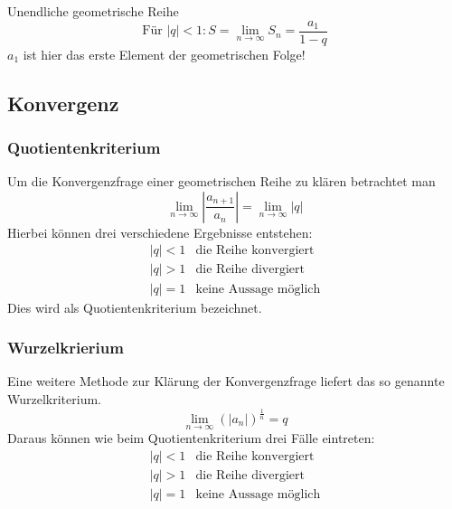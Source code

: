 Unendliche geometrische Reihe
\[ \boxed{\text{Für } |q| < 1: S = \lim_{n \rightarrow \infty} S_n 
= \frac{a_1}{1 - q}} \] 
$a_1$ ist hier das erste Element der geometrischen Folge!

\subsection{Konvergenz}

\subsubsection*{Quotientenkriterium}
Um die Konvergenzfrage einer geometrischen Reihe zu klären betrachtet man
\[\boxed{ \lim\limits_{n \rightarrow \infty} \left| \frac{a_{n+1}}{a_n} \right| 
= \lim\limits_{n \rightarrow \infty} \left| q \right|} \]
Hierbei können drei verschiedene Ergebnisse entstehen:
\[ \boxed{\begin{array}{ll}
|q| < 1 & \text{die Reihe konvergiert} \\
|q| > 1 & \text{die Reihe divergiert} \\
|q| = 1 & \text{keine Aussage möglich}
\end{array}} \]
Dies wird als Quotientenkriterium bezeichnet.

\subsubsection*{Wurzelkrierium}
Eine weitere Methode zur Klärung der Konvergenzfrage liefert das so genannte 
Wurzelkriterium.
\[\boxed{ \lim\limits_{n \rightarrow \infty} \left( |a_n| \right)^{\frac{1}{n}} 
= q }\]
Daraus können wie beim Quotientenkriterium drei Fälle eintreten:
\[ \boxed{\begin{array}{ll}
|q| < 1 & \text{die Reihe konvergiert} \\
|q| > 1 & \text{die Reihe divergiert} \\
|q| = 1 & \text{keine Aussage möglich} 
\end{array}} \]


\ifti
